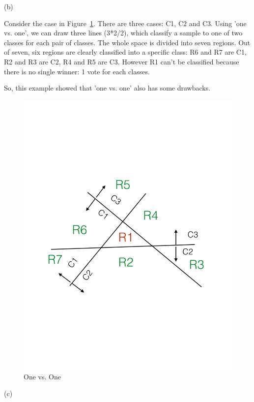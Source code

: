 \documentclass[11pt]{article}
\theoremstyle{definition}
\begin{document}
(b)

Consider the case in Figure~\ref{fig:one-one}. There are three cases: C1, C2 and C3. Using
'one vs. one', we can draw three lines (3*2/2), which classify a sample to one
of two classes for each pair of classes.  The whole space is divided into seven
regions.  Out of seven, six regions are clearly classified into a specific
class: R6 and R7 are C1, R2 and R3 are C2, R4 and R5 are C3.  However R1 can't
be classified because there is no single winner: 1 vote for each classes.

So, this example showed that 'one vs. one' also has some drawbacks.

\begin{figure}[h]
  \centering
  \includegraphics[width=\textwidth]{one-one}
  \caption{One vs. One}
  \label{fig:one-one}
\end{figure}

(c)
\end{document}

